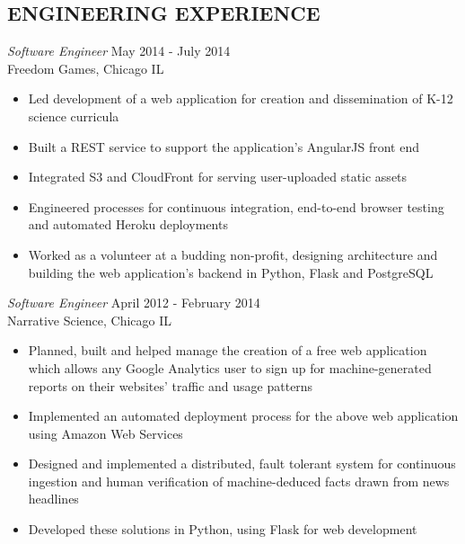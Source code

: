 \documentclass[line,margin]{res}
\begin{document}
\address{waltaskew@gmail.com}
\address{404-819-9796}

\begin{resume}

\section{ENGINEERING EXPERIENCE}
        {\sl Software Engineer} \hfill May 2014 - July 2014 \\
        Freedom Games, Chicago IL
        \begin{itemize}
          \item Led development of a web application for creation and
            dissemination of K-12 science curricula
          \item Built a REST service to support the application's AngularJS
            front end
            \item Integrated S3 and CloudFront for serving user-uploaded static
              assets
            \item Engineered processes for continuous integration, end-to-end
              browser testing and automated Heroku deployments
            \item Worked as a volunteer at a budding non-profit, designing
              architecture and building the web application's backend in
              Python, Flask and PostgreSQL
        \end{itemize}

        {\sl Software Engineer} \hfill April 2012 - February 2014 \\
        Narrative Science, Chicago IL
        \begin{itemize}
          \item Planned, built and helped manage the creation of a
            free web application which allows any Google Analytics
            user to sign up for machine-generated reports on their
            websites' traffic and usage patterns
          \item Implemented an automated deployment process for the
            above web application using Amazon Web Services
          \item Designed and implemented a distributed, fault tolerant
            system for continuous ingestion and human verification of
            machine-deduced facts drawn from news headlines
          \item Developed these solutions in Python, using Flask for
            web development
        \end{itemize}


\end{resume}
\end{document}
